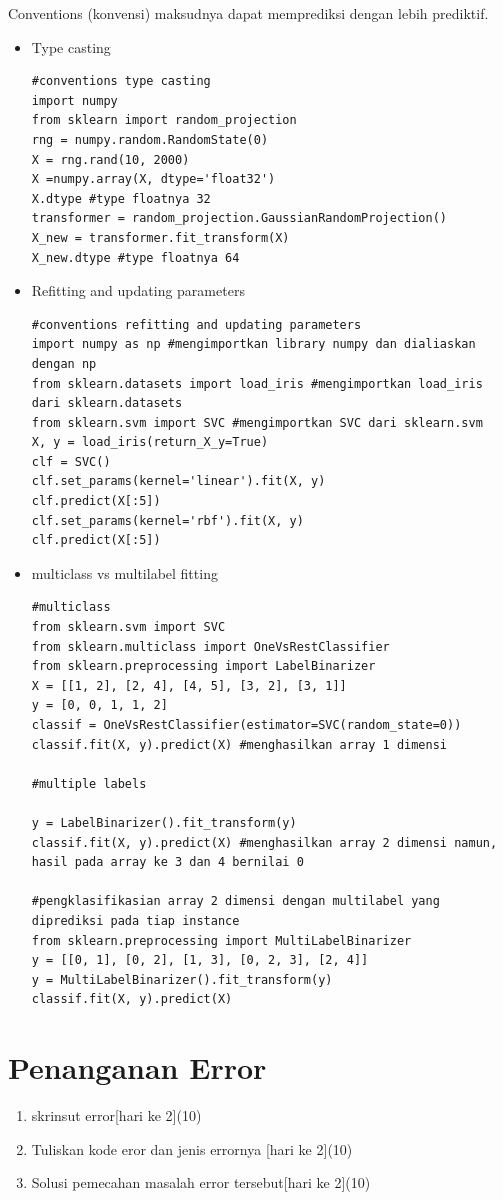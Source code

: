 \begin{enumerate}
Conventions (konvensi) maksudnya dapat memprediksi dengan lebih prediktif.\\
\begin{itemize}
    \item Type casting
    \begin{lstlisting}
#conventions type casting
import numpy
from sklearn import random_projection
rng = numpy.random.RandomState(0)
X = rng.rand(10, 2000)
X =numpy.array(X, dtype='float32')
X.dtype #type floatnya 32
transformer = random_projection.GaussianRandomProjection()
X_new = transformer.fit_transform(X)
X_new.dtype #type floatnya 64 
    \end{lstlisting}
    \item Refitting and updating parameters
\begin{lstlisting}
#conventions refitting and updating parameters
import numpy as np #mengimportkan library numpy dan dialiaskan dengan np
from sklearn.datasets import load_iris #mengimportkan load_iris dari sklearn.datasets
from sklearn.svm import SVC #mengimportkan SVC dari sklearn.svm
X, y = load_iris(return_X_y=True)
clf = SVC()
clf.set_params(kernel='linear').fit(X, y)
clf.predict(X[:5])
clf.set_params(kernel='rbf').fit(X, y)
clf.predict(X[:5])
\end{lstlisting}
    \item multiclass vs multilabel fitting
\begin{lstlisting}
#multiclass
from sklearn.svm import SVC
from sklearn.multiclass import OneVsRestClassifier
from sklearn.preprocessing import LabelBinarizer
X = [[1, 2], [2, 4], [4, 5], [3, 2], [3, 1]]
y = [0, 0, 1, 1, 2]
classif = OneVsRestClassifier(estimator=SVC(random_state=0))
classif.fit(X, y).predict(X) #menghasilkan array 1 dimensi

#multiple labels

y = LabelBinarizer().fit_transform(y)
classif.fit(X, y).predict(X) #menghasilkan array 2 dimensi namun, hasil pada array ke 3 dan 4 bernilai 0

#pengklasifikasian array 2 dimensi dengan multilabel yang diprediksi pada tiap instance
from sklearn.preprocessing import MultiLabelBinarizer
y = [[0, 1], [0, 2], [1, 3], [0, 2, 3], [2, 4]]
y = MultiLabelBinarizer().fit_transform(y)
classif.fit(X, y).predict(X)
\end{lstlisting}
\end{itemize}
\end{enumerate}
\section{Penanganan Error}
\begin{enumerate}
	\item
	skrinsut error[hari ke 2](10)
	\item
Tuliskan kode eror dan jenis errornya [hari ke 2](10)
	\item
Solusi pemecahan masalah error tersebut[hari ke 2](10)

\end{enumerate}